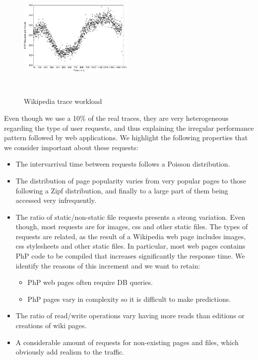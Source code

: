 

\begin{figure}
\begin{center}
\includegraphics[width=0.49\textwidth, height=6cm]{./images/traceWorkload}
\end{center}
\caption{Wikipedia trace workload}
\label{workload}
\end{figure}

Even though we use a 10\% of the real traces, they are very heterogeneous regarding the type of user requests, and thus explaining the irregular performance pattern followed by web applications. 
We highlight the following properties that we consider important about these requests: 

\begin{itemize}
\item The intervarrival time between requests follows a Poisson distribution.

\item The distribution of page popularity varies from very popular pages to those following a Zipf distribution, and finally to a large part of them being accessed very infrequently.

\item The ratio of static/non-static file requestspresents a strong variation. Even though, most requests are for images, css and other static files. The types of requests are related, as the result of a Wikipedia web page includes images, css stylesheets and other static files. In particular, most web pages contains PhP code to be compiled that increases significantly the response time. We identify the reasons of this increment and we want to retain:

\begin{itemize}
\item PhP web pages often require DB queries.
\item PhP pages vary in complexity so it is difficult to make predictions.
\end{itemize}

\item The ratio of read/write operations vary having more reads than editions or creations of wiki pages.

\item A considerable amount of requests for non-existing pages and files, which obviously add realism to the traffic.

\end{itemize}


